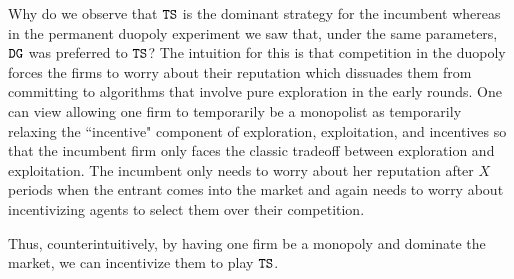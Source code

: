 \documentclass[../competing_bandits.tex]{subfiles}
\begin{document}
Why do we observe that $\mathtt{TS}$ is the dominant strategy for the incumbent whereas in the permanent duopoly experiment we saw that, under the same parameters, $\mathtt{DG}$ was preferred to $\mathtt{TS}$? The intuition for this is that competition in the duopoly forces the firms to worry about their reputation which dissuades them from committing to algorithms that involve pure exploration in the early rounds. One can view allowing one firm to temporarily be a monopolist as temporarily relaxing the ``incentive" component of exploration, exploitation, and incentives so that the incumbent firm only faces the classic tradeoff between exploration and exploitation. The incumbent only needs to worry about her reputation after $X$ periods when the entrant comes into the market and again needs to worry about incentivizing agents to select them over their competition. 

 Thus, counterintuitively, by having one firm be a monopoly and dominate the market, we can incentivize them to play $\mathtt{TS}$.
\end{document}
